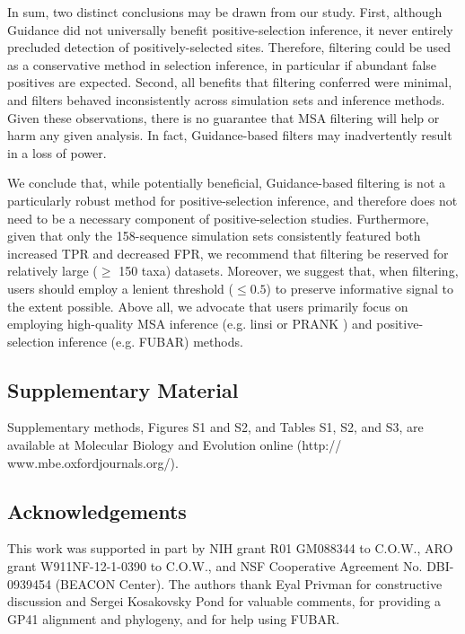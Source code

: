 \documentclass[11pt]{article}
\begin{document}
In sum, two distinct conclusions may be drawn from our study. First, although Guidance did not universally benefit positive-selection inference, it never entirely precluded detection of positively-selected sites. Therefore, filtering could be used as a conservative method in selection inference, in particular if abundant false positives are expected. Second, all benefits that filtering conferred were minimal, and filters behaved inconsistently across simulation sets and inference methods. Given these observations, there is no guarantee that MSA filtering will help or harm any given analysis. In fact, Guidance-based filters may inadvertently result in a loss of power.

We conclude that, while potentially beneficial, Guidance-based filtering is not a particularly robust method for positive-selection inference, and therefore does not need to be a necessary component of positive-selection studies. Furthermore, given that only the 158-sequence simulation sets consistently featured both increased TPR and decreased FPR, we recommend that filtering be reserved for relatively large ($\geq$ 150 taxa) datasets. Moreover, we suggest that, when filtering, users should employ a lenient threshold ($\leq0.5$) to preserve informative signal to the extent possible. Above all, we advocate that users primarily focus on employing high-quality MSA inference (e.g. linsi \citep{Katoh2005} or PRANK \citep{Loytynoja2008}) and positive-selection inference (e.g. FUBAR) methods. 


\subsection*{Supplementary Material}
Supplementary methods, Figures S1 and S2, and Tables S1, S2, and S3, are available at Molecular Biology and Evolution online (http:// www.mbe.oxfordjournals.org/).


\subsection*{Acknowledgements}
 This work was supported in part by NIH grant R01 GM088344 to C.O.W., ARO grant W911NF-12-1-0390 to  C.O.W.,  and NSF Cooperative Agreement No. DBI-0939454 (BEACON Center). The authors thank Eyal Privman for constructive discussion and Sergei Kosakovsky Pond for valuable comments, for providing a GP41 alignment and phylogeny, and for help using FUBAR.



	
\end{document}
